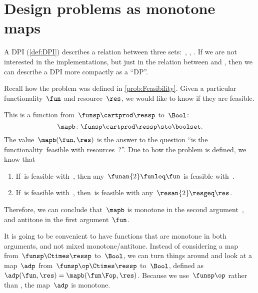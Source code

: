 
\section[DPs as monotone maps]{Design problems as monotone maps}
\label{sec:dpdefinition}


A DPI (\cref{def:DPI}) describes a relation between three sets:~\funsp, \ressp, \impsp.
If we are not interested in the implementations, but just in the relation between \funsp and \ressp, then we can describe a DPI more compactly as a ``DP''\@.

Recall how the problem \Feasibility was defined in \cref{prob:Feasibility}.
Given a particular functionality~$\fun$ and resource~$\res$, we would like to know if they are feasible.

This is a function from~$\funsp \cartprod \ressp$ to~$\Bool$:
%
\begin{equation}
    \mapb\colon \funsp \cartprod \ressp \sto \boolset.
\end{equation}
%
The value~$\mapb(\fun, \res)$ is the answer to the question ``is the functionality~\fun feasible with resources~\res?''.
Due to how the problem is defined, we know that%
\begin{enumerate}
    \item If~\fun is feasible with~\res, then any~$\funan{2} \funleq \fun$ is feasible with~\res.
    \item If~\fun is feasible with~\res, then~\fun is feasible with any~$\resan{2} \resgeq \res$.
\end{enumerate}
Therefore, we can conclude that~$\mapb$ is monotone in the second argument~\res, and antitone in the first argument~$\fun$.

It is going to be convenient to have functions that are monotone in both arguments, and not mixed monotone/antitone.
Instead of considering a map from~$\funsp \Ctimes \ressp$ to~$\Bool$, we can turn things around and look at a map~$\adp$ from~$\funsp\op \Ctimes \ressp$ to~$\Bool$, defined as~$\adp(\fun,\res) = \mapb(\fun\Fop,\res)$.
Because we use~$\funsp\op$ rather than \funsp, the map~$\adp$ is monotone.


